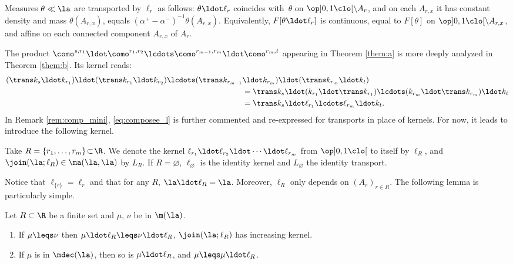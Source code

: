 \begin{rem}\label{rem:action_l}Measures $\theta\ll \la$ are transported by $\ell_r$ as follows: $\theta\ldot \ell_r$ coincides with~$\theta$ on $\op]0,1\clo[\setminus A_r$, and on each $A_{r,x}$ it has constant density and mass $\theta(A_{r,x})$, \ie equals $(\alpha^+-\alpha^-)^{-1}\theta(A_{r,x})$. Equivalently, $F[\theta\ldot \ell_r]$ is continuous, equal to $F[\theta]$ on $\op]0,1\clo[\setminus A_{r,x}$, and affine on each connected component $A_{r,x}$ of $A_r$.
\end{rem}

The product $\como^{s,r_1}{}\ldot\como^{r_1,r_2}\lcdots \como^{r_{m-1},r_m}{}\ldot\como^{r_m,t}$ appearing in Theorem \ref{them:a} is more deeply analyzed in Theorem \ref{them:b}. Its kernel reads:
\begin{equation}\label{eq:composee_l}
\begin{aligned}
(\trans k_s\ldot k_{r_1})\ldot(\trans k_{r_1}{}\ldot k_{r_2})\lcdots (\trans k_{r_{m-1}}&\ldot k_{r_m})\ldot(\trans k_{r_m}{}\ldot k_t)\\
&= \trans k_s\ldot(k_{r_1}{}\ldot\trans k_{r_1})\lcdots (k_{r_m}{}\ldot\trans k_{r_m})\ldot k_t\\
&=\trans k_s\ldot\ell_{r_1}\lcdots \ell_{r_m}{}\ldot k_t.
\end{aligned}
\end{equation}
In Remark \ref{rem:comp_mini}, \eqref{eq:composee_l} is further commented and re-expressed for transports in place of kernels. For now, it leads to introduce the following kernel.

\begin{notation}\label{notation:Ts}
Take $R=\{r_1,\ldots,r_m\}\!\subset\!\R$. We denote the kernel \hbox{$\ell_{r_1}{}\ldot\ell_{r_2}{}\ldot\cdots\ldot\ell_{r_m}$} from $\op]0,1\clo[$ to itself by $\ell_R$, and $\join(\la;\ell_R)\in\ma(\la,\la)$ by $L_R$. If $R=\varnothing$, $\ell_\varnothing$ is the identity kernel and $L_\varnothing$ the identity transport.
\end{notation}

Notice that $\ell_{\{r\}}=\ell_r$ and that for any $R$, $\la\ldot\ell_R=\la$. Moreover, $\ell_R$ only depends on $(A_r)_{r\in R}$. The following lemma is particularly simple.

\begin{lem}\label{lem:mono1}
Let $R\subset \R$ be a finite set and $\mu,\,\nu$ be in $\m(\la)$.

\begin{enumerate}
\item
\label{item:mono1a} If $\mu\leqs \nu$ then $\mu \ldot\ell_R\leqs \nu\ldot\ell_R$, \ie $\join(\la; \ell_R)$ has increasing kernel.
\item
\label{item:mono1b} If $\mu$ is in $\mdec(\la)$, then so is $\mu \ldot\ell_R$, and $\mu\leqs \mu\ldot\ell_R$.
\end{enumerate}
\end{lem}

